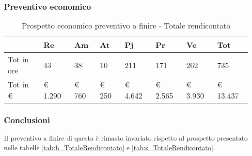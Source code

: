 		\subsubsection{Preventivo economico}
									\begin{table}[H] \begin{center} \begin{tabular}{llllllll}
									\toprule
										&	\textbf{Re}	&	\textbf{Am}	&	\textbf{At}	&	\textbf{Pj}	&	\textbf{Pr}	&	\textbf{Ve}	&	\textbf{Tot}	 \\

									\midrule
									Tot in ore	&	43	&	38	&	10	&	211	&	171	&	262	&	735	 \\


									Tot in €	&	 €  1.290 	 & 	 €      760 	 & 	 €     250 	 & 	 €  4.642 	 & 	 € 2.565 	 & 	 €  3.930 	 & 	 €  13.437 	 \\
									\bottomrule
									\end{tabular} \end{center} \caption{Prospetto economico preventivo a finire				 -
									Totale rendicontato
									}\end{table}

		\subsubsection{Conclusioni} Il preventivo a finire di questa  è rimasto invariato rispetto al prospetto presentato nelle tabelle \ref{tab:h_TotaleRendicontato} e \ref{tab:s_TotaleRendicontato}.
